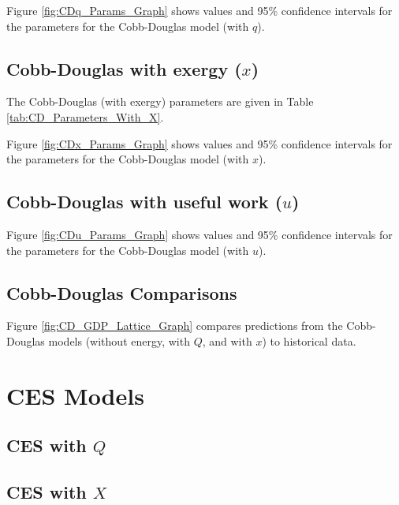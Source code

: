 \documentclass[preprint,authoryear,12pt]{elsarticle}\usepackage{graphicx, color}
\begin{document}
Figure \ref{fig:CDq_Params_Graph} shows values and 95\% confidence intervals for the parameters for the Cobb-Douglas model (with $q$).




\subsection{Cobb-Douglas with exergy ($x$)}

The Cobb-Douglas (with exergy) parameters are given in Table \ref{tab:CD_Parameters_With_X}.

Figure \ref{fig:CDx_Params_Graph} shows values and 95\% confidence intervals for the parameters for the Cobb-Douglas model (with $x$).




\subsection{Cobb-Douglas with useful work ($u$)}

Figure \ref{fig:CDu_Params_Graph} shows values and 95\% confidence intervals for the parameters for the Cobb-Douglas model (with $u$).




\subsection{Cobb-Douglas Comparisons}

Figure \ref{fig:CD_GDP_Lattice_Graph} compares predictions from the Cobb-Douglas models (without energy, with $Q$, and with $x$) to historical data.




\section{CES Models}




\subsection{CES with $Q$}







\subsection{CES with $X$}
\end{document}
